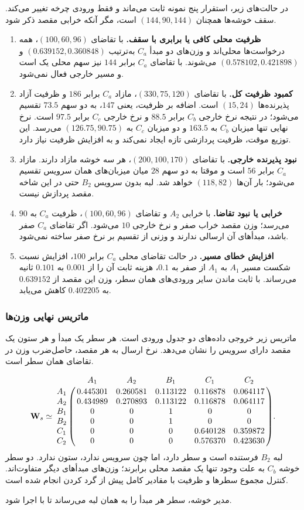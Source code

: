 در حالت‌های زیر، استقرار پنج نمونه ثابت می‌ماند و فقط ورودی چرخه تغییر می‌کند. سقف خوشه‌ها همچنان $(144,90,144)$ است، مگر آنکه خرابی مقصد ذکر شود.
\begin{enumerate}[label=\arabic*.,leftmargin=*]
\item \textbf{ظرفیت محلی کافی یا برابری با سقف.}
با تقاضای $(100,60,96)$، همه درخواست‌ها محلی‌اند و وزن‌های دو مبدأ $C_a$ به‌ترتیب $(0.639152,0.360848)$ و $(0.578102,0.421898)$ می‌شوند. با تقاضای $C_a$ برابر $144$ نیز سهم محلی یک است و مسیر خارجی فعال نمی‌شود.
\item \textbf{کمبود ظرفیت کل.}
با تقاضای $(330,75,120)$، مازاد $C_a$ برابر $186$ و ظرفیت آزاد پذیرنده‌ها $(15,24)$ است. اضافه بر ظرفیت، یعنی $147$، به دو سهم $73.5$ تقسیم می‌شود؛ در نتیجه نرخ خارجی $C_b$ برابر $88.5$ و نرخ خارجی $C_c$ برابر $97.5$ است. نرخ نهایی تنها میزبان $C_b$ به $163.5$ و دو میزبان $C_c$ به $(126.75,90.75)$ می‌رسد. این توزیع موقت، ظرفیت پردازشی تازه ایجاد نمی‌کند و به افزایش ظرفیت نیاز دارد.
\item \textbf{نبود پذیرنده خارجی.}
با تقاضای $(200,100,170)$، هر سه خوشه مازاد دارند. مازاد $C_a$ برابر $56$ است و موقتا به دو سهم $28$ میان میزبان‌های همان سرویس تقسیم می‌شود؛ بار آن‌ها $(118,82)$ خواهد شد. لبه بدون سرویس $B_2$ حتی در این شاخه مقصد پردازش نیست.
\item \textbf{خرابی یا نبود تقاضا.}
با خرابی $A_2$ و تقاضای $(100,60,96)$، ظرفیت $C_a$ به $90$ می‌رسد؛ وزن مقصد خراب صفر و نرخ خارجی $10$ می‌شود. اگر تقاضای $C_a$ صفر باشد، مبدأهای آن ارسالی ندارند و وزنی از تقسیم بر نرخ صفر ساخته نمی‌شود.
\item \textbf{افزایش خطای مسیر.}
در حالت تقاضای محلی $C_a$ برابر $100$، افزایش نسبت شکست مسیر $A_1$ به $A_1$ از صفر به $0.1$، هزینه ثابت آن را از $0.001$ به $0.101$ ثانیه می‌رساند. با ثابت ماندن سایر ورودی‌های همان سطر، وزن این مقصد از $0.639152$ به $0.402205$ کاهش می‌یابد.
\end{enumerate}

\subsubsection{ماتریس نهایی وزن‌ها}

ماتریس زیر خروجی داده‌های دو جدول ورودی است. هر سطر یک مبدأ و هر ستون یک مقصد دارای سرویس را نشان می‌دهد. نرخ ارسال به هر مقصد، حاصل‌ضرب وزن در تقاضای همان سطر است.

\begin{equation}
\mathbf W_s\simeq
\bordermatrix{
 & A_1 & A_2 & B_1 & C_1 & C_2\cr
A_1 & 0.445301 & 0.260581 & 0.113122 & 0.116878 & 0.064117\cr
A_2 & 0.434989 & 0.270893 & 0.113122 & 0.116878 & 0.064117\cr
B_1 & 0 & 0 & 1 & 0 & 0\cr
B_2 & 0 & 0 & 1 & 0 & 0\cr
C_1 & 0 & 0 & 0 & 0.640128 & 0.359872\cr
C_2 & 0 & 0 & 0 & 0.576370 & 0.423630\cr
}.
\label{eq:example-weight-matrix}
\end{equation}
لبه $B_2$ فرستنده است و سطر دارد، اما چون سرویس ندارد، ستون ندارد. دو سطر خوشه $C_b$ به علت وجود تنها یک مقصد محلی برابرند؛ وزن‌های مبدأهای دیگر متفاوت‌اند. کنترل مجموع سطرها و ظرفیت با مقادیر کامل پیش از گرد کردن انجام شده است.

مدیر خوشه، سطر هر مبدأ را به همان لبه می‌رساند تا با  اجرا شود.
